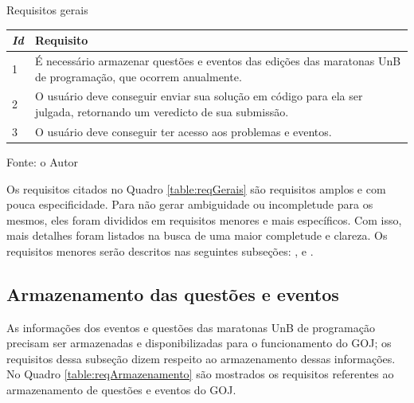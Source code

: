 \begin{quadro}
    \caption{Requisitos gerais}
    \centering
    \label{table:reqGerais}
    \begin{threeparttable}
    \begin{tabular}{ |p{0.5cm}|p{10cm}|  }
        \hline
        
        \textit{\textbf{Id}} & 
        \textbf{Requisito} \\
        \hline
        
        1 & É necessário armazenar questões e eventos das edições das maratonas UnB de programação, que ocorrem anualmente.  \\
        \hline
        
        2 & O usuário deve conseguir enviar sua solução em código para ela ser julgada, retornando um veredicto de sua submissão.  \\ 
        \hline
        
        3 & O usuário deve conseguir ter acesso aos problemas e eventos.  \\
        \hline
    \end{tabular}
    \medskip
    \begin{tablenotes}
        \centering
        \item Fonte: o Autor
    \end{tablenotes}
    \end{threeparttable}

\end{quadro}

Os requisitos citados no Quadro \ref{table:reqGerais} são requisitos amplos e com pouca especificidade. Para não gerar ambiguidade ou incompletude para os mesmos, eles foram divididos em requisitos menores e mais específicos. Com isso, mais detalhes foram listados na busca de uma maior completude e clareza. Os requisitos menores serão descritos nas seguintes subseções: ,  e .

\subsection{Armazenamento das questões e eventos}
\label{subsec:storage}

As informações dos eventos e questões das maratonas UnB de programação precisam ser armazenadas e disponibilizadas para o funcionamento do GOJ; os requisitos dessa subseção dizem respeito ao armazenamento dessas informações. No Quadro \ref{table:reqArmazenamento} são mostrados os requisitos referentes ao armazenamento de questões e eventos do GOJ.

